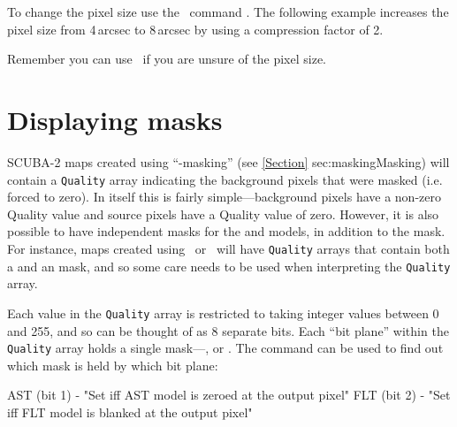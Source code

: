 To change the pixel size use the \Kappa\ command \compave. The
following example increases the pixel size from 4\,arcsec to 8\,arcsec
by using a compression factor of 2.

\begin{terminalv}
\end{terminalv}

\begin{tip}
  Remember you can use \ndftrace\ if you are unsure of the pixel size.
\end{tip}



\section{Displaying masks}
\label{sec:maskshow}

SCUBA-2 maps created using ``-masking'' (see \cref{Section}
{sec:masking}{Masking}) will contain a \texttt{Quality} array indicating the
background pixels that were masked (i.e. forced to zero). In itself this
is fairly simple---background pixels have a non-zero Quality value and
source pixels have a Quality value of zero. However, it is also possible
to have independent masks for the  and  models,
in addition to the  mask. For instance, maps created using
\brightextended\ or \jsageneric\ will have \texttt{Quality} arrays that
contain both a  and an  mask, and so some care needs
to be used when interpreting the \texttt{Quality} array.

Each value in the \texttt{Quality} array is restricted to taking integer values
between 0 and 255, and so can be thought of as 8 separate bits. Each ``bit
plane'' within the \texttt{Quality} array holds a single mask---,
 or . The 
command can be used to find out which mask is held by which bit plane:

\begin{terminalv}
   AST (bit 1) - "Set iff AST model is zeroed at the output pixel"
   FLT (bit 2) - "Set iff FLT model is blanked at the output pixel"
\end{terminalv}

